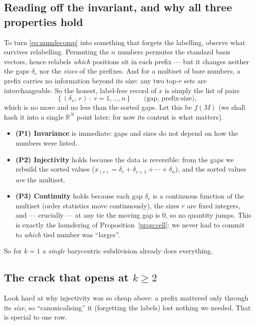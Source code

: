 \documentclass[11pt,a4paper]{article}
\theoremstyle{definition}
\theoremstyle{plain}
\newcommand{\R}{\mathbb{R}}
\begin{document}
\subsection{Reading off the invariant, and why all three properties hold}

To turn \eqref{eq:numdecomp} into something that forgets the labelling, observe
what survives relabelling. Permuting the $n$ numbers permutes the standard basis
vectors, hence relabels \emph{which} positions sit in each prefix --- but it
changes neither the gaps $\delta_r$ nor the \emph{sizes} of the prefixes. And
for a multiset of bare numbers, a prefix carries no information beyond its
size: any two top-$r$ sets are interchangeable. So the honest, label-free record
of $x$ is simply the list of pairs
\[
   \bigl\{\,(\delta_r,\ r)\ :\ r=1,\dots,n\,\bigr\}
   \qquad\text{(gap, prefix-size)},
\]
which is no more and no less than the sorted gaps. Let this be $f(M)$ (we shall
hash it into a single $\R^N$ point later; for now its content is what matters).

\begin{itemize}[leftmargin=*]
\item \textbf{(P1) Invariance} is immediate: gaps and sizes do not depend on how
      the numbers were listed.
\item \textbf{(P2) Injectivity} holds because the data is reversible: from the
      gaps we rebuild the sorted values ($x_{(r)}=\delta_r+\delta_{r+1}+\cdots
      +\delta_n$), and the sorted values \emph{are} the multiset.
\item \textbf{(P3) Continuity} holds because each gap $\delta_r$ is a continuous
      function of the multiset (order statistics move continuously), the sizes
      $r$ are fixed integers, and --- crucially --- at any tie the moving gap is
      $0$, so no quantity jumps. This is exactly the laundering of
      Proposition~\ref{prop:cell}: we never had to commit to \emph{which}
      tied number was ``larger''.
\end{itemize}

\noindent
So for $k=1$ a \emph{single} barycentric subdivision already does everything.

\subsection{The crack that opens at $k\ge2$}
\label{sec:crack}

Look hard at why injectivity was so cheap above: a prefix mattered only through
its \emph{size}, so ``canonicalising'' it (forgetting the labels) lost nothing
we needed. That is special to one row.
\end{document}
